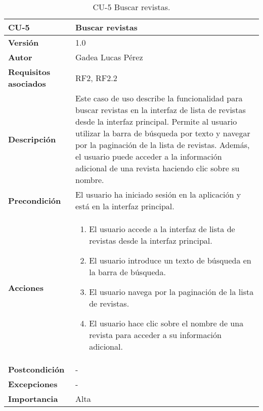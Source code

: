 \begin{table}[p]
\centering
\begin{tabularx}{\linewidth}{ p{} p{} }
\toprule
\textbf{CU-5} & \textbf{Buscar revistas}\\
\toprule
\textbf{Versión} & 1.0 \\
\textbf{Autor} & Gadea Lucas Pérez \\
\textbf{Requisitos asociados} & RF2, RF2.2 \\
\textbf{Descripción} & Este caso de uso describe la funcionalidad para buscar revistas en la interfaz de lista de revistas desde la interfaz principal. Permite al usuario utilizar la barra de búsqueda por texto y navegar por la paginación de la lista de revistas. Además, el usuario puede acceder a la información adicional de una revista haciendo clic sobre su nombre. \\
\textbf{Precondición} & El usuario ha iniciado sesión en la aplicación y está en la interfaz principal. \\
\textbf{Acciones} &
\begin{enumerate}
\def\labelenumi{\arabic{enumi}.}
\tightlist
\item El usuario accede a la interfaz de lista de revistas desde la interfaz principal.
\item El usuario introduce un texto de búsqueda en la barra de búsqueda.
\item El usuario navega por la paginación de la lista de revistas.
\item El usuario hace clic sobre el nombre de una revista para acceder a su información adicional.
\end{enumerate}\\
\textbf{Postcondición} & - \\
\textbf{Excepciones} & - \\
\textbf{Importancia} & Alta\
\bottomrule
\end{tabularx}
\caption{CU-5 Buscar revistas.}
\label{tab:cu5}
\end{table}



